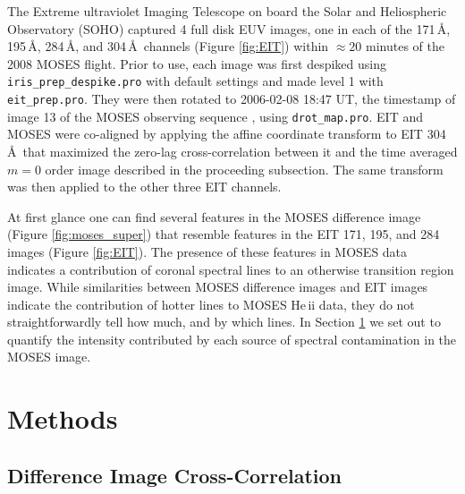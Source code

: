 		The Extreme ultraviolet Imaging Telescope \citep[EIT:][]{EIT} on board the Solar and Heliospheric Observatory (SOHO) captured 4 full disk EUV images, one in each of the 171\,\AA, 195\,\AA, 284\,\AA, and 304\,\AA\ channels (Figure \ref{fig:EIT}) within $\approx20$ minutes of the 2008 MOSES flight.
		Prior to use, each image was first despiked using \texttt{iris\_prep\_despike.pro} with default settings and made level 1 with \texttt{eit\_prep.pro}. 
		They were then rotated to 2006-02-08 18:47 UT, the timestamp of image 13 of the MOSES observing sequence \citep{Fox2011}, using \texttt{drot\_map.pro}.
		EIT and MOSES were co-aligned by applying the affine coordinate transform to EIT 304\,\AA\ that maximized the zero-lag cross-correlation between it and the time averaged $m=0$ order image described in the proceeding subsection.
		The same transform was then applied to the other three EIT channels.
	 
		At first glance one can find several features in the MOSES difference image (Figure \ref{fig:moses_super}) that resemble features in the EIT 171, 195, and 284 images (Figure \ref{fig:EIT}).  
		The presence of these features in MOSES data indicates a contribution of coronal spectral lines to an otherwise transition region image.  
		While similarities between MOSES difference images and EIT images indicate the contribution of hotter lines to MOSES He\,{\sc ii} data, they do not straightforwardly tell how much, and by which lines.  
		In Section \ref{sec:methods} we set out to quantify the intensity contributed by each source of spectral contamination in the MOSES image.
		
		
\section{Methods}\label{sec:methods}
 	\subsection{Difference Image Cross-Correlation}\label{sec:crosscorrelation}
 	
